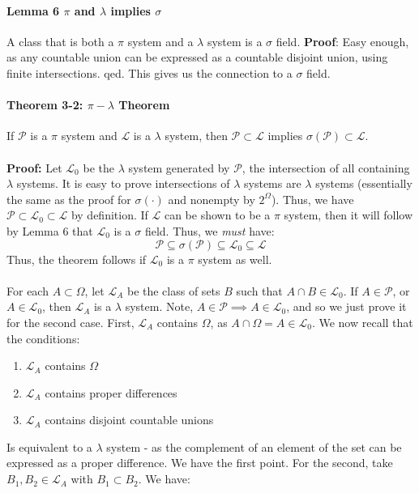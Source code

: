 \documentclass[12pt,a4paper]{article}
\newcommand{\1}[1]{\mathbbm{1}\left\{ #1 \right\}}
\newcommand{\lcal}{\mathcal{L}}
\newcommand{\pcal}{\mathcal{P}}
\begin{document}
\paragraph{Lemma 6 $\pi$ and $\lambda$ implies $\sigma$} A class that is both a $\pi$ system and a $\lambda$ system is a $\sigma$ field. \textbf{Proof}: Easy enough, as any countable union can be expressed as a countable disjoint union, using finite intersections. qed. This gives us the connection to a $\sigma$ field.

\paragraph{Theorem 3-2: $\pi-\lambda$ Theorem} If $\pcal$ is a $\pi$ system and $\lcal$ is a $\lambda$ system, then $\pcal \subset \lcal$ implies $\sigma(\pcal) \subset \lcal$.
\\\\
\textbf{Proof:} Let $\lcal_0$ be the $\lambda$ system generated by $\pcal$, the intersection of all containing $\lambda$ systems. It is easy to prove intersections of $\lambda$ systems are $\lambda$ systems (essentially the same as the proof for $\sigma(\cdot)$ and nonempty by $2^\Omega$). Thus, we have $\pcal \subset \lcal_0 \subset \lcal$ by definition. If $\lcal$ can be shown to be a $\pi$ system, then it will follow by Lemma 6 that $\lcal_0$ is a $\sigma$ field. Thus, we \textit{must} have:
$$
	\pcal \subseteq \sigma(\pcal) \subseteq \lcal_0 \subseteq \lcal
$$
Thus, the theorem follows if $\lcal_0$ is a $\pi$ system as well.
\\\\
For each $A \subset \Omega$, let $\lcal_A$ be the class of sets $B$ such that $A \cap B \in \lcal_0$. If $A \in \pcal$, or $A \in \lcal_0$, then $\lcal_A$ is a $\lambda$ system. Note, $A \in \pcal \implies A \in \lcal_0$, and so we just prove it for the second case. First, $\lcal_A$ contains $\Omega$, as $A \cap \Omega = A \in \lcal_0$. We now recall that the conditions:
\begin{enumerate}
	\item $\lcal_A$ contains $\Omega$
	\item $\lcal_A$ contains proper differences
	\item $\lcal_A$ contains disjoint countable unions
\end{enumerate}
Is equivalent to a $\lambda$ system - as the complement of an element of the set can be expressed as a proper difference. We have the first point. For the second, take $B_1, B_2 \in \lcal_A$ with $B_1 \subset B_2$. We have:
\end{document}
